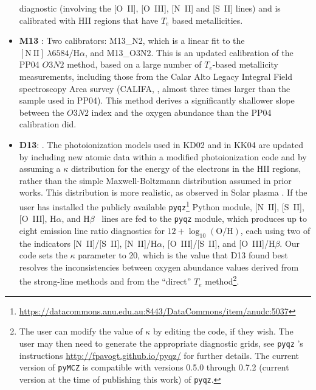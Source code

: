 \documentclass{emulateapj}
\newcommand{\oxabinline}{\ensuremath{12 + \log_{10}(\mathrm{O}/\mathrm{H})}}
\newcommand{\ha}{\ensuremath{\mathrm{H}\alpha}}
\newcommand{\hb}{\ensuremath{\mathrm{H}\beta}}
\begin{document}
\begin{itemize}
  diagnostic (involving the [O~II], [O~III], [N~II] and [S~II] lines)
  and is calibrated with HII regions that have $T_e$ based
  metallicities.
\item {\bf M13} \citep{marino13}: Two calibrators: M13\_N2, which is a
  linear fit to the $\mathrm{[N~II]}~\lambda6584/\ha$, and
  M13\_O3N2. This is an updated calibration of the PP04 $O3N2$ method,
  based on a large number of $T_e$-based metallicity measurements,
  including those from the Calar Alto Legacy Integral Field
  spectroscopy Area survey (CALIFA, \citealt{sanchez12}, almost three
  times larger than the sample used in PP04). This method derives a
  significantly shallower slope between the $O3N2$ index and the
  oxygen abundance than the PP04 calibration did.
\item {\bf D13}: \citep{dopita13}. The photoionization models used in
  KD02 and in KK04 are updated by including new atomic data within a
  modified photoionization code and by assuming a $\kappa$
  distribution for the energy of the electrons in the HII regions,
  rather than the simple Maxwell-Boltzmann distribution assumed in
  prior works. This distribution is more realistic, as observed in
  Solar plasma \citep{nicholls12}. If the user has installed the
  publicly available
  \verb=pyqz=\footnote{\url{https://datacommons.anu.edu.au:8443/DataCommons/item/anudc:5037}}
  Python module, [N~II], [S~II], [O~III], \ha, and \hb~ lines are fed
  to the \verb=pyqz= module, which produces up to eight emission line
  ratio diagnostics for \oxabinline, each using two of the indicators
  [N~II]/[S~II], [N~II]/\ha, [O~III]/[S~II], and [O~III]/\hb. Our code
  sets the $\kappa$ parameter to 20, which is the value that D13 found
  best resolves the inconsistencies between oxygen abundance values
  derived from the strong-line methods and from the ``direct'' $T_e$
  method\footnote{The user can modify the value of $\kappa$ by editing
    the code, if they wish. The user may then need to generate the
    appropriate diagnostic grids, see \texttt{pyqz} ’s instructions
    \url{http://fpavogt.github.io/pyqz/} for further details. The
    current version of \texttt{pyMCZ} is compatible with versions 0.5.0 through
    0.7.2 (current version at the time of publishing this work) of  \texttt{pyqz}.}.


\end{itemize}
\end{document}
